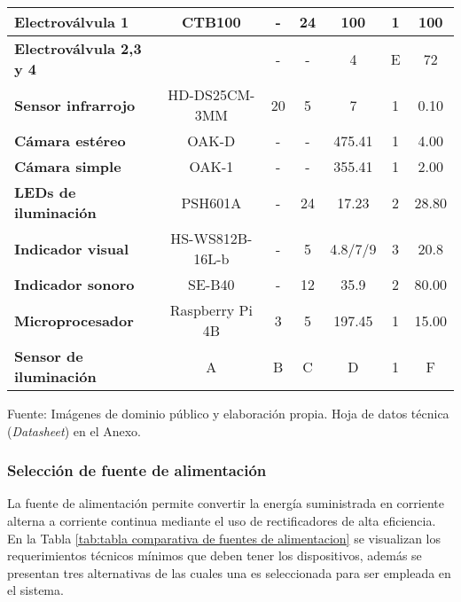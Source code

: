 \begin{mytable}[H]
\begin{tabular}{l|c|c|c|c|c|c|}
		\multicolumn{1}{|l|}{\cellcolor[HTML]{C0C0C0}\textbf{Electroválvula 1}} & CTB100 & - & 24 & 100 & 1 & 100 \\ \hline
		\multicolumn{1}{|l|}{\cellcolor[HTML]{C0C0C0}\textbf{Electroválvula 2,3 y 4}} &  & - & - & 4 & E & 72 \\ \hline
		\multicolumn{1}{|l|}{\cellcolor[HTML]{C0C0C0}\textbf{Sensor infrarrojo}} & HD-DS25CM-3MM & 20 & 5 & 7 & 1 & 0.10 \\ \hline
		\multicolumn{1}{|l|}{\cellcolor[HTML]{C0C0C0}\textbf{Cámara estéreo}} & OAK-D & - & - & 475.41 & 1 & 4.00 \\ \hline
		\multicolumn{1}{|l|}{\cellcolor[HTML]{C0C0C0}\textbf{Cámara simple}} & OAK-1 & - & - & 355.41 & 1 & 2.00 \\ \hline
		\multicolumn{1}{|l|}{\cellcolor[HTML]{C0C0C0}\textbf{LEDs de iluminación}} & PSH601A & - & 24 & 17.23 & 2 & 28.80 \\ \hline
		\multicolumn{1}{|l|}{\cellcolor[HTML]{C0C0C0}\textbf{Indicador visual}} & HS-WS812B-16L-b & - & 5 & 4.8/7/9 & 3 & 20.8 \\ \hline
		\multicolumn{1}{|l|}{\cellcolor[HTML]{C0C0C0}\textbf{Indicador sonoro}} & SE-B40 & - & 12 & 35.9 & 2 & 80.00 \\ \hline
		\multicolumn{1}{|l|}{\cellcolor[HTML]{C0C0C0}\textbf{Microprocesador}} & Raspberry Pi 4B & 3 & 5 & 197.45 & 1 & 15.00 \\ \hline
		\multicolumn{1}{|l|}{\cellcolor[HTML]{C0C0C0}\textbf{Sensor de iluminación}} & A & B & C & D & 1 & F \\ \hline
	\end{tabular}
	\begin{myflushcenteraftertable}	
		Fuente: Imágenes de dominio público y elaboración propia. Hoja de datos técnica (\textit{Datasheet}) en el Anexo.
	\end{myflushcenteraftertable}
\end{mytable}


\subsubsection{Selección de fuente de alimentación} 

La fuente de alimentación permite convertir la energía suministrada en corriente alterna a corriente continua mediante el uso de rectificadores de alta eficiencia. En la Tabla \ref{tab:tabla comparativa de fuentes de alimentacion} se visualizan los requerimientos técnicos mínimos que deben tener los dispositivos, además se presentan tres alternativas de las cuales una es seleccionada para ser empleada en el sistema.


